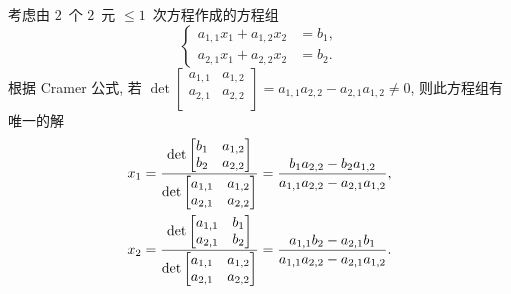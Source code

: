 \documentclass[../libro.tex]{subfiles}
\begin{document}
\begin{example}
    考虑由 \(2\)~个 \(2\)~元 \({\leq} 1\)~次方程作成的方程组
    \begin{equation*}
        \left\{ %
        \begin{aligned}
            a_{1,1} x_1 + a_{1,2} x_2 & = b_1, \\
            a_{2,1} x_1 + a_{2,2} x_2 & = b_2.
        \end{aligned}
        \right. %
    \end{equation*}
    根据 Cramer 公式, 若
    \(\det {
            \begin{bmatrix}
                a_{1,1} & a_{1,2} \\
                a_{2,1} & a_{2,2} \\
            \end{bmatrix}
        }
    = a_{1,1} a_{2,2} - a_{2,1} a_{1,2} \neq 0\),
    则此方程组有唯一的解
    \begin{align*}
        x_1
        = \frac{\det {
                \begin{bmatrix}
                    b_{1} & a_{1,2} \\
                    b_{2} & a_{2,2} \\
                \end{bmatrix}
        }}{\det {
                \begin{bmatrix}
                    a_{1,1} & a_{1,2} \\
                    a_{2,1} & a_{2,2} \\
                \end{bmatrix}
        }}
        = \frac{b_1 a_{2,2} - b_2 a_{1,2}}
        {a_{1,1} a_{2,2} - a_{2,1} a_{1,2}},
        \\
        x_2
        = \frac{\det {
                \begin{bmatrix}
                    a_{1,1} & b_{1} \\
                    a_{2,1} & b_{2} \\
                \end{bmatrix}
        }}{\det {
                \begin{bmatrix}
                    a_{1,1} & a_{1,2} \\
                    a_{2,1} & a_{2,2} \\
                \end{bmatrix}
        }}
        = \frac{a_{1,1} b_2 - a_{2,1} b_1}
        {a_{1,1} a_{2,2} - a_{2,1} a_{1,2}}.
        \qedhere
    \end{align*}
\end{example}
\end{document}
